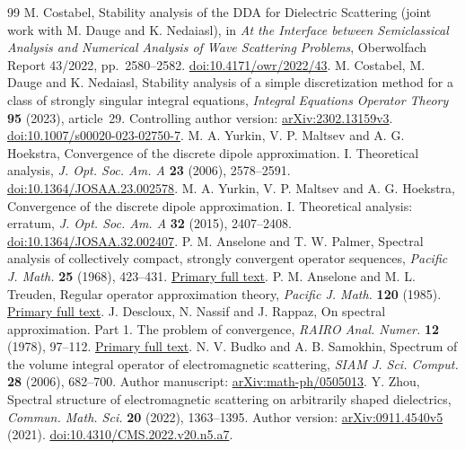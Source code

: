 \documentclass[11pt]{article}
\theoremstyle{remark}\newtheorem{remark}[theorem]{Remark}
\begin{document}
\begin{thebibliography}{99}
 M. Costabel, Stability analysis of the DDA for Dielectric Scattering (joint work with M. Dauge and K. Nedaiasl), in \emph{At the Interface between Semiclassical Analysis and Numerical Analysis of Wave Scattering Problems}, Oberwolfach Report 43/2022, pp.~2580--2582. \href{https://doi.org/10.4171/owr/2022/43}{doi:10.4171/owr/2022/43}.
 M. Costabel, M. Dauge and K. Nedaiasl, Stability analysis of a simple discretization method for a class of strongly singular integral equations, \emph{Integral Equations Operator Theory} \textbf{95} (2023), article~29. Controlling author version: \href{https://arxiv.org/abs/2302.13159v3}{arXiv:2302.13159v3}. \href{https://doi.org/10.1007/s00020-023-02750-7}{doi:10.1007/s00020-023-02750-7}.
 M. A. Yurkin, V. P. Maltsev and A. G. Hoekstra, Convergence of the discrete dipole approximation. I. Theoretical analysis, \emph{J. Opt. Soc. Am. A} \textbf{23} (2006), 2578--2591. \href{https://doi.org/10.1364/JOSAA.23.002578}{doi:10.1364/JOSAA.23.002578}.
 M. A. Yurkin, V. P. Maltsev and A. G. Hoekstra, Convergence of the discrete dipole approximation. I. Theoretical analysis: erratum, \emph{J. Opt. Soc. Am. A} \textbf{32} (2015), 2407--2408. \href{https://doi.org/10.1364/JOSAA.32.002407}{doi:10.1364/JOSAA.32.002407}.
 P. M. Anselone and T. W. Palmer, Spectral analysis of collectively compact, strongly convergent operator sequences, \emph{Pacific J. Math.} \textbf{25} (1968), 423--431. \href{https://msp.org/pjm/1968/25-3/pjm-v25-n3-p02-p.pdf}{Primary full text}.
 P. M. Anselone and M. L. Treuden, Regular operator approximation theory, \emph{Pacific J. Math.} \textbf{120} (1985). \href{https://msp.org/pjm/1985/120-2/pjm-v120-n2-p01-p.pdf}{Primary full text}.
 J. Descloux, N. Nassif and J. Rappaz, On spectral approximation. Part 1. The problem of convergence, \emph{RAIRO Anal. Numer.} \textbf{12} (1978), 97--112. \href{https://www.numdam.org/article/M2AN_1978__12_2_97_0.pdf}{Primary full text}.
 N. V. Budko and A. B. Samokhin, Spectrum of the volume integral operator of electromagnetic scattering, \emph{SIAM J. Sci. Comput.} \textbf{28} (2006), 682--700. Author manuscript: \href{https://arxiv.org/abs/math-ph/0505013}{arXiv:math-ph/0505013}.
 Y. Zhou, Spectral structure of electromagnetic scattering on arbitrarily shaped dielectrics, \emph{Commun. Math. Sci.} \textbf{20} (2022), 1363--1395. Author version: \href{https://arxiv.org/abs/0911.4540v5}{arXiv:0911.4540v5} (2021). \href{https://doi.org/10.4310/CMS.2022.v20.n5.a7}{doi:10.4310/CMS.2022.v20.n5.a7}.

\end{thebibliography}
\end{document}
